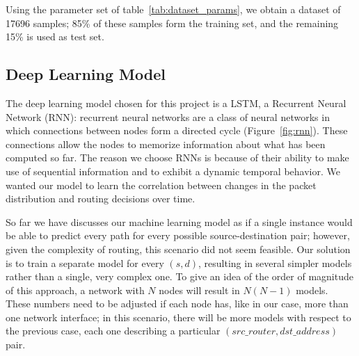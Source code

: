 \begin{table}[b]
\caption{Dataset generation parameters.}
\label{tab:dataset_params}
\end{table}

Using the parameter set of table~\ref{tab:dataset_params}, we obtain a dataset of 17696 samples; 85\% of these samples form the training set, and the remaining 15\% is used as test set.

\subsection{Deep Learning Model}
\label{sec:dl_model}
The deep learning model chosen for this project is a LSTM, a Recurrent Neural Network (RNN): recurrent neural networks are a class of neural networks in which connections between nodes form a directed cycle (Figure~\ref{fig:rnn}). These connections allow the nodes to memorize information about what has been computed so far. The reason we choose RNNs is because of their ability to make use of sequential information and to exhibit a dynamic temporal behavior. We wanted our model to learn the correlation between changes in the packet distribution and routing decisions over time.

So far we have discusses our machine learning model as if a single instance would be able to  predict every path for every possible source-destination pair; however, given the complexity of routing, this scenario did not seem feasible. Our solution is to train a separate model for every $(s,d)$, resulting in several simpler models rather than a single, very complex one. To give an idea of the order of magnitude of this approach, a network with $N$ nodes will result in $N(N-1)$ models. These numbers need to be adjusted if each node has, like in our case, more than one network interface; in this scenario, there will be more models with respect to the previous case, each one describing a particular $(src\_router, dst\_address)$ pair.

